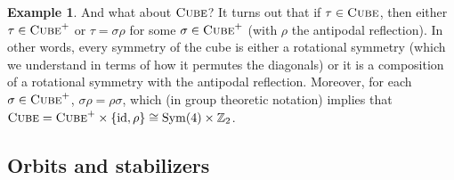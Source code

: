 \documentclass[11pt]{amsart}
\theoremstyle{plain}
\theoremstyle{definition}
\newtheorem{example}{Example}
\theoremstyle{remark}
\DeclareMathOperator{\Sym}{Sym}
\newcommand{\symcube}{\textsc{Cube}}
\newcommand{\rsymcube}{\textsc{Cube}^+}
\DeclareMathOperator{\id}{id}
\begin{document}
\begin{example}
And what about $\symcube$? It turns out that if $\tau \in \symcube$, then either $\tau \in \rsymcube$ or $\tau = \sigma\rho$ for some $\sigma \in \rsymcube$ (with $\rho$ the antipodal reflection). In other words, every symmetry of the cube is either a rotational symmetry (which we understand in terms of how it permutes the diagonals) or it is a composition of a rotational symmetry with the antipodal reflection. Moreover, for each $\sigma \in \rsymcube$, $\sigma \rho = \rho\sigma$, which (in group theoretic notation) implies that $\symcube = \rsymcube \times \{\id, \rho\} \cong \Sym(4) \times \mathbb{Z}_2$.
\end{example}


\subsection{Orbits and stabilizers}
\end{document}
